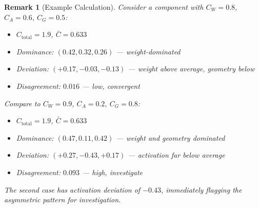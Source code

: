 \documentclass[11pt]{article}
\newtheorem{remark}{Remark}[section]
\begin{document}
\begin{remark}[Example Calculation]
\label{rem:output-example-calculation}
Consider a component with $C_W = 0.8$, $C_A = 0.6$, $C_G = 0.5$:
\begin{itemize}[nosep]
\item $C_{\text{total}} = 1.9$, $\bar{C} = 0.633$
\item Dominance: $(0.42, 0.32, 0.26)$ --- weight-dominated
\item Deviation: $(+0.17, -0.03, -0.13)$ --- weight above average, geometry below
\item Disagreement: $0.016$ --- low, convergent
\end{itemize}
Compare to $C_W = 0.9$, $C_A = 0.2$, $C_G = 0.8$:
\begin{itemize}[nosep]
\item $C_{\text{total}} = 1.9$, $\bar{C} = 0.633$
\item Dominance: $(0.47, 0.11, 0.42)$ --- weight and geometry dominated
\item Deviation: $(+0.27, -0.43, +0.17)$ --- activation far below average
\item Disagreement: $0.093$ --- high, investigate
\end{itemize}
The second case has activation deviation of $-0.43$, immediately flagging the asymmetric pattern for investigation.
\end{remark}
\end{document}
